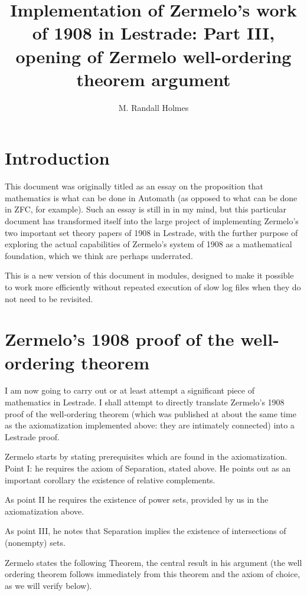 \documentclass[12pt]{article}
\title{Implementation of Zermelo's work of 1908 in Lestrade:  Part III, opening of Zermelo well-ordering theorem argument}
\author{M. Randall Holmes}
\begin{document}
\maketitle

\section{Introduction}
 
This document was originally titled as an essay on the proposition that mathematics is what can be done in Automath (as opposed to what can be done in ZFC, for example).  Such an essay is still in in my mind, but this particular document has transformed itself into the large project of implementing Zermelo's two important set theory papers of 1908 in Lestrade, with the further purpose of exploring the actual capabilities of Zermelo's system of 1908 as a mathematical foundation, which we think are perhaps underrated.

This is a new version of this document in modules, designed to make it possible to work more efficiently without repeated execution of slow log files when they do not need to be revisited.

\section{Zermelo's 1908 proof of the well-ordering theorem}

I am now going to carry out or at least attempt a significant piece of mathematics in Lestrade.  I shall attempt to directly translate Zermelo's 1908 proof of the well-ordering theorem
(which was published at about the same time as the axiomatization implemented above:  they are intimately connected) into a Lestrade proof.

Zermelo starts by stating prerequisites which are found in the axiomatization.  Point I:  he requires the axiom of Separation, stated above.  He points out as an important corollary the existence of
relative complements.

As point II he requires the existence of power sets, provided by us in the axiomatization above. 

As point III, he notes that Separation implies the existence of intersections of (nonempty) sets.



Zermelo states the following Theorem, the central result in his argument (the well ordering theorem follows immediately from this theorem and the axiom of choice, as we will verify below).
\end{document}
